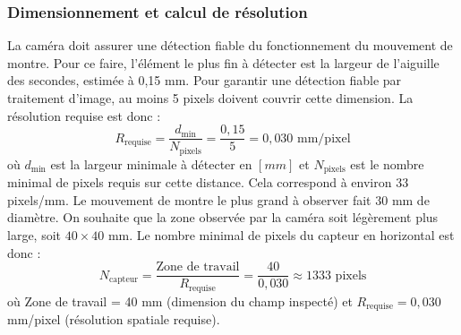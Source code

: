 \subsubsection{Dimensionnement et calcul de résolution}
La caméra doit assurer une détection fiable du fonctionnement du mouvement de montre. 
Pour ce faire, l'élément le plus fin à détecter est la largeur de l'aiguille des secondes, estimée à 0,15 mm. 
Pour garantir une détection fiable par traitement d'image, au moins 5 pixels doivent couvrir cette dimension.
La résolution requise est donc :
\begin{equation}
    R_{\text{requise}} = \frac{d_{\text{min}}}{N_{\text{pixels}}} = \frac{0,15}{5} = 0,030 \text{ mm/pixel}
    \label{eq:resolution_spatiale}
\end{equation}
\noindent où $d_{\text{min}}$ est la largeur minimale à détecter en $[mm]$ et $N_{\text{pixels}}$ est le nombre minimal de pixels requis sur cette distance.
Cela correspond à environ 33 pixels/mm. 
Le mouvement de montre le plus grand à observer fait $30$ mm de diamètre. 
On souhaite que la zone observée par la caméra soit légèrement plus large, soit $40 \times 40$ mm. 
Le nombre minimal de pixels du capteur en horizontal est donc :
\begin{equation}
    N_{\text{capteur}} = \frac{\text{Zone de travail}}{R_{\text{requise}}} = \frac{40}{0,030} \approx 1333 \text{ pixels}
    \label{eq:resolution_capteur}
\end{equation}
\noindent où Zone de travail = 40 mm (dimension du champ inspecté) et $R_{\text{requise}} = 0,030$ mm/pixel (résolution spatiale requise).
